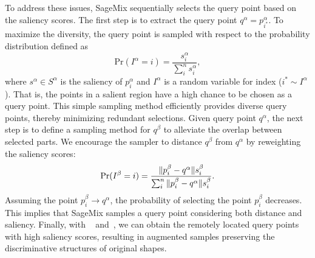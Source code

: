 \documentclass{article}
\begin{document}
To address these issues, SageMix sequentially selects the query point based on the saliency scores. The first step is to extract the query point $q^\alpha = p^\alpha_{i^\ast}$. To maximize the diversity, the query point is sampled with respect to the probability distribution defined as
\begin{equation}
{\text{Pr}}(I^\alpha=i) = \frac{s^\alpha_i}{\sum_i^n s^\alpha_i},
\label{eq:prob_alpha}
\end{equation}
where $s^\alpha \in S^\alpha$ is the saliency of $p^\alpha_i$ and $I^\alpha$ is a random variable for index ($i^\ast \sim I^\alpha$). 
That is, the points in a salient region have a high chance to be chosen as a query point.
This simple sampling method efficiently provides diverse query points, thereby minimizing redundant selections.
Given query point $q^\alpha$, the next step is to define a sampling method for $q^\beta$ to alleviate the overlap between selected parts.
We encourage the sampler to distance $q^\beta$ from $q^\alpha$ by reweighting the saliency scores:  
\begin{equation}
{\text{Pr}}(I^\beta=i) = \frac{\|\point^\beta_i - q^\alpha\|s^\beta_i}{\sum_i^n \|\point^\beta_i - q^\alpha\|s^\beta_i}.
\label{eq:prob_beta}
\end{equation}
Assuming the point $p^\beta_i \rightarrow q^\alpha$, the probability of selecting the point $p^\beta_i$ decreases.
This implies that SageMix samples a query point considering both distance and saliency.
Finally, with ~ and~, we can obtain the remotely located query points with high saliency scores, resulting in augmented samples preserving the discriminative structures of original shapes.
\end{document}
